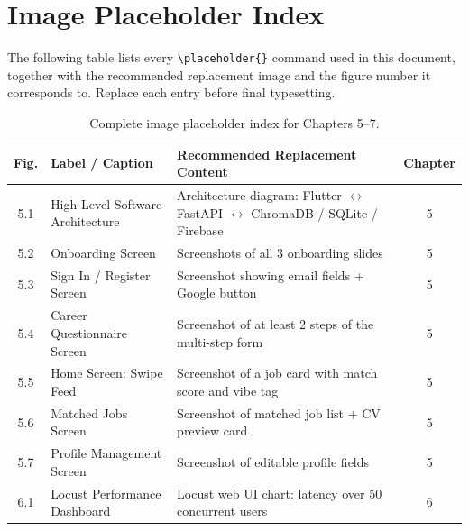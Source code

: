 \documentclass[12pt, a4paper, oneside]{report}
\begin{document}
\newpage
\section*{Image Placeholder Index}
\label{sec:placeholder-index}

The following table lists every \texttt{\textbackslash placeholder\{\}} command used in this
document, together with the recommended replacement image and the figure number it
corresponds to. Replace each entry before final typesetting.

\begin{table}[H]
  \centering
  \caption{Complete image placeholder index for Chapters 5--7.}
  \label{tab:placeholder-index}
  \renewcommand{\arraystretch}{1.4}
  \begin{tabularx}{\textwidth}{@{} c l X c @{}}
    \toprule
    \textbf{Fig.} & \textbf{Label / Caption}              & \textbf{Recommended Replacement Content}           & \textbf{Chapter} \\
    \midrule
    5.1  & High-Level Software Architecture       & Architecture diagram: Flutter $\leftrightarrow$ FastAPI $\leftrightarrow$ ChromaDB / SQLite / Firebase & 5 \\
    5.2  & Onboarding Screen                      & Screenshots of all 3 onboarding slides                  & 5 \\
    5.3  & Sign In / Register Screen              & Screenshot showing email fields + Google button          & 5 \\
    5.4  & Career Questionnaire Screen            & Screenshot of at least 2 steps of the multi-step form   & 5 \\
    5.5  & Home Screen: Swipe Feed                & Screenshot of a job card with match score and vibe tag  & 5 \\
    5.6  & Matched Jobs Screen                    & Screenshot of matched job list + CV preview card         & 5 \\
    5.7  & Profile Management Screen              & Screenshot of editable profile fields                    & 5 \\
    6.1  & Locust Performance Dashboard           & Locust web UI chart: latency over 50 concurrent users   & 6 \\
    \bottomrule
  \end{tabularx}
\end{table}
\end{document}
